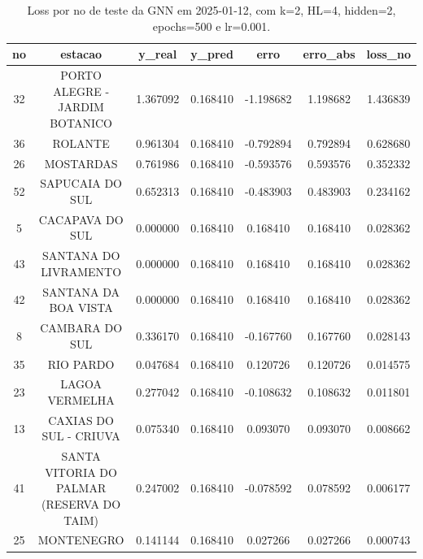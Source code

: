 \begin{table}[h]
\centering
\caption{Loss por no de teste da GNN em 2025-01-12, com k=2, HL=4, hidden=2, epochs=500 e lr=0.001.}
\label{tab:gnn_loss_k2_hl4_h2_e500_d20250112}
\begin{tabular}{ccccccc}
\toprule
no & estacao & y\_real & y\_pred & erro & erro\_abs & loss\_no \\
\midrule
32 & PORTO ALEGRE - JARDIM BOTANICO & 1.367092 & 0.168410 & -1.198682 & 1.198682 & 1.436839 \\
36 & ROLANTE & 0.961304 & 0.168410 & -0.792894 & 0.792894 & 0.628680 \\
26 & MOSTARDAS & 0.761986 & 0.168410 & -0.593576 & 0.593576 & 0.352332 \\
52 & SAPUCAIA DO SUL & 0.652313 & 0.168410 & -0.483903 & 0.483903 & 0.234162 \\
5 & CACAPAVA DO SUL & 0.000000 & 0.168410 & 0.168410 & 0.168410 & 0.028362 \\
43 & SANTANA DO LIVRAMENTO & 0.000000 & 0.168410 & 0.168410 & 0.168410 & 0.028362 \\
42 & SANTANA DA BOA VISTA & 0.000000 & 0.168410 & 0.168410 & 0.168410 & 0.028362 \\
8 & CAMBARA DO SUL & 0.336170 & 0.168410 & -0.167760 & 0.167760 & 0.028143 \\
35 & RIO PARDO & 0.047684 & 0.168410 & 0.120726 & 0.120726 & 0.014575 \\
23 & LAGOA VERMELHA & 0.277042 & 0.168410 & -0.108632 & 0.108632 & 0.011801 \\
13 & CAXIAS DO SUL - CRIUVA & 0.075340 & 0.168410 & 0.093070 & 0.093070 & 0.008662 \\
41 & SANTA VITORIA DO PALMAR (RESERVA DO TAIM) & 0.247002 & 0.168410 & -0.078592 & 0.078592 & 0.006177 \\
25 & MONTENEGRO & 0.141144 & 0.168410 & 0.027266 & 0.027266 & 0.000743 \\
\bottomrule
\end{tabular}
\end{table}
